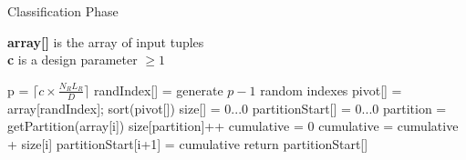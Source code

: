 \begin{algorithm}
\small
\caption{Classification Phase}
\label{alg:read_phase}
\textbf{array[]} is the array of input tuples\\
\textbf{c} is a design parameter $\geq 1$\\
\begin{algorithmic}[1]
\State p = $\lceil c\times \frac{N_R L_R}{D} \rceil$
\State randIndex[] = generate $p-1$ random indexes
\State pivot[] = array[randIndex];
\State sort(pivot[])
\State size[] = {0...0}   
\State partitionStart[] = {0...0}
\State partition = getPartition(array[i]) 
\State size[partition]++ 
\EndFor
{}
\State cumulative = 0
\State cumulative = cumulative + size[i]
\State partitionStart[i+1] = cumulative
\EndFor
{}
\State return partitionStart[]
\end{algorithmic}

\end{algorithm}
